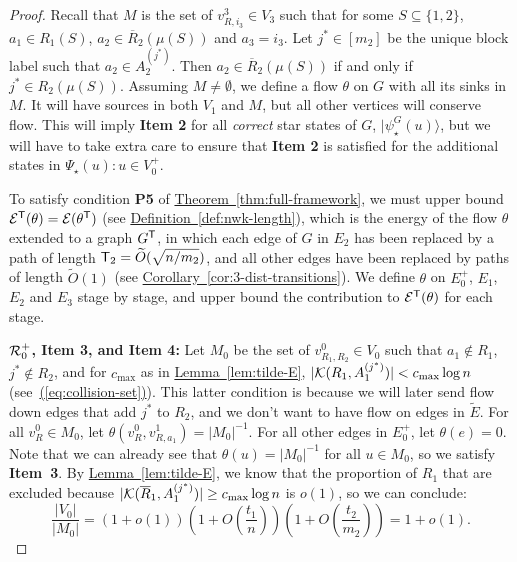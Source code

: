 \documentclass{article}
\newcommand{\eq}[1]{\hyperref[eq:#1]{(\ref*{eq:#1})}}
\newcommand{\thm}[1]{\hyperref[thm:#1]{Theorem~\ref*{thm:#1}}}
\newcommand{\lem}[1]{\hyperref[lem:#1]{Lemma~\ref*{lem:#1}}}
\newcommand{\cor}[1]{\hyperref[cor:#1]{Corollary~\ref*{cor:#1}}}
\newcommand{\defin}[1]{\hyperref[def:#1]{Definition~\ref*{def:#1}}}
\def\ket#1{{\lvert}#1\rangle}
\renewcommand{\>}{\rangle}
\newcommand{\<}{\langle}
\renewcommand{\(}{\left(}
\renewcommand{\)}{\right)}
\begin{document}
\begin{proof}
Recall that $M$ is the set of $v^3_{R,i_3}\in V_3$ such that for some $S\subseteq \{1,2\}$, 
$a_1\in R_1(S)$, $a_2\in \overline{R}_2(\mu(S))$ and $a_3=i_3$. Let $j^*\in [m_2]$ be the unique block label such that $a_2\in A_2^{(j^*)}$. Then $a_2\in \overline{R}_2(\mu(S))$ if and only if $j^*\in R_2(\mu(S))$. 
Assuming $M\neq\emptyset$, we define a flow $\theta$ on $G$ with all its sinks in $M$. It will have sources in both $V_1$ and $M$, but all other vertices will conserve flow. This will imply \textbf{Item 2} for all \emph{correct} star states of $G$, $\ket{\psi_\star^G(u)}$, but we will have to take extra care to ensure that \textbf{Item 2} is satisfied for the additional states in $\Psi_\star(u):u\in V_0^+$. 

To satisfy condition \textbf{P5} of \thm{full-framework}, we must upper bound ${\cal E}^{\sf T}(\theta)={\cal E}(\theta^{\sf T})$ (see \defin{nwk-length}), which is the energy of the flow $\theta$ extended to a graph $G^{\sf T}$, in which each edge of $G$ in $E_2$ has been replaced by a path of length ${\sf T}_2=\widetilde{O}(\sqrt{n/m_2})$, and all other edges have been replaced by paths of length $\widetilde{O}(1)$ (see \cor{3-dist-transitions}).
We define $\theta$ on $E_0^+$, $E_1$, $E_2$ and $E_3$ stage by stage, and upper bound the contribution to ${\cal E}^{\sf T}(\theta)$ for each stage.

\vskip7pt
\noindent\textbf{${\cal R}_0^+$, Item 3, and Item 4:} Let $M_0$ be the set of $v^0_{R_1,R_2}\in V_0$ such that $a_1\not\in R_1$, $j^*\not\in R_2$, and for $c_{\max}$ as in \lem{tilde-E}, $|{\cal K}({R}_1,A_1^{(j^*)})|<c_{\max}\log n$ (see~\eq{collision-set}). This latter condition is because we will later send flow down edges that add $j^*$ to $R_2$, and we don't want to have flow on edges in $\tilde{E}$. For all $v^0_{R}\in M_0$, let $\theta(v^0_{R},v^1_{R,a_1})={|M_0|}^{-1}$. For all other edges in $E_0^+$, let $\theta(e)=0$. Note that we can already see that $\theta(u)={|M_0|}^{-1}$ for all $u\in M_0$, so we satisfy \textbf{Item~3}. By \lem{tilde-E}, we know that the proportion of $R_1$ that are excluded because $|{\cal K}(\overline{R}_1,A_1^{(j^*)})|\geq c_{\max}\log n$ is $o(1)$, so we can conclude:
\begin{equation}
\frac{|V_0|}{|M_0|} = (1+o(1))\left(1+O\left(\frac{t_1}{n}\right)\right)\left(1+O\left(\frac{t_2}{m_2}\right)\right) = 1+o(1).\label{eq:V0-M0}
\end{equation}


\end{proof}
\end{document}
